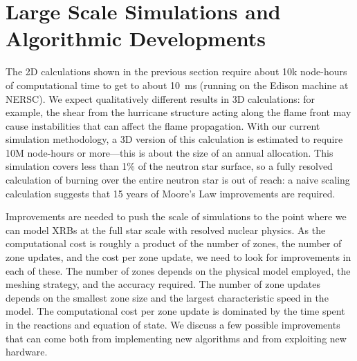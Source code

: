 \documentclass[a4paper]{jpconf}
\begin{document}
\section{Large Scale Simulations and Algorithmic Developments}

The 2D calculations shown in the previous section require about 10k
node-hours of computational time to get to about 10~ms (running
on the Edison machine at NERSC).  We expect qualitatively different
results in 3D calculations: for example, the shear from the hurricane structure
acting along the flame front may cause instabilities that can affect the flame
propagation.
With our current simulation methodology,
a 3D version of this calculation is estimated to require 10M node-hours
or more---this is about the size of an annual allocation.
This simulation covers less than
1\% of the neutron star surface, so a fully resolved calculation of
burning over the entire neutron star is out of reach: a naive scaling
calculation suggests that 15 years of Moore's Law improvements are required.
%
%

Improvements are needed to push the scale of simulations
to the point where we can model XRBs at the full star scale with
resolved nuclear physics.
As the computational cost is roughly a product of the number of zones, the
number of zone updates, and the cost per zone update, we need to look for
improvements in each of these. The number of zones depends on the physical
model employed, the meshing strategy, and the accuracy required. The number of
zone updates depends on the smallest zone size and the largest characteristic
speed in the model. The computational cost per zone update is dominated by the
time spent in the reactions and equation of state. We discuss a few
possible improvements that can come both from implementing new algorithms and
from exploiting new hardware.


\end{document}
